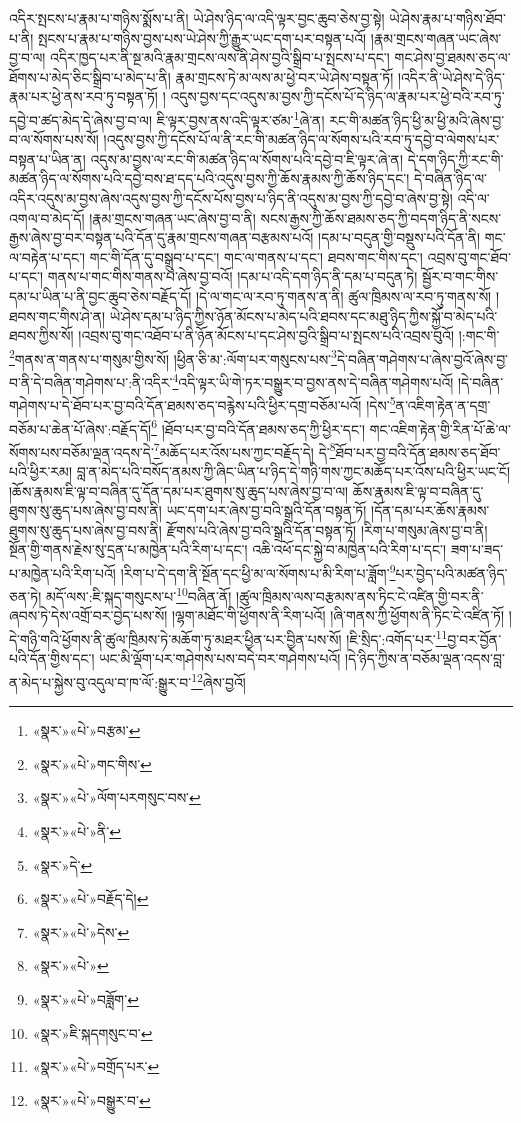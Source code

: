 འདིར་སྤངས་པ་རྣམ་པ་གཉིས་སྨོས་པ་ནི། ཡེ་ཤེས་ཉིད་ལ་འདི་ལྟར་བྱང་ཆུབ་ཅེས་བྱ་སྟེ། ཡེ་ཤེས་རྣམ་པ་གཉིས་ཐོབ་པ་ནི། སྤངས་པ་རྣམ་པ་གཉིས་བྱས་པས་ཡེ་ཤེས་ཀྱི་རྒྱུར་ཡང་དག་པར་བསྟན་པའོ། །རྣམ་གྲངས་གཞན་ཡང་ཞེས་བྱ་བ་ལ། འདིར་ཁྱད་པར་ནི་སྔ་མའི་རྣམ་གྲངས་ལས་ནི་ཤེས་བྱའི་སྒྲིབ་པ་སྤངས་པ་དང་། གང་ཤེས་བྱ་ཐམས་ཅད་ལ་ཐོགས་པ་མེད་ཅིང་སྒྲིབ་པ་མེད་པ་ནི། རྣམ་གྲངས་ཏེ་མ་ལས་མ་ཕྱེ་བར་ཡེ་ཤེས་བསྟན་ཏོ། །འདིར་ནི་ཡེ་ཤེས་དེ་ཉིད་རྣམ་པར་ཕྱེ་ནས་རབ་ཏུ་བསྟན་ཏོ། །
འདུས་བྱས་དང་འདུས་མ་བྱས་ཀྱི་དངོས་པོ་དེ་ཉིད་ལ་རྣམ་པར་ཕྱེ་བའི་རབ་ཏུ་དབྱེ་བ་ཚད་མེད་དེ་ཞེས་བྱ་བ་ལ། ཇི་ལྟར་བྱས་ནས་འདི་ལྟར་ཙམ་\footnote{«སྣར་»«པེ་»བརྩམ་}ཞེ་ན། རང་གི་མཚན་ཉིད་ཕྱི་མ་ཕྱི་མའི་ཞེས་བྱ་བ་ལ་སོགས་པས་སོ། །འདུས་བྱས་ཀྱི་དངོས་པོ་ལ་ནི་རང་གི་མཚན་ཉིད་ལ་སོགས་པའི་རབ་ཏུ་དབྱེ་བ་ལེགས་པར་བསྟན་པ་ཡིན་ན། འདུས་མ་བྱས་ལ་རང་གི་མཚན་ཉིད་ལ་སོགས་པའི་དབྱེ་བ་ཇི་ལྟར་ཞེ་ན། དེ་དག་ཉིད་ཀྱི་རང་གི་མཚན་ཉིད་ལ་སོགས་པའི་དབྱེ་བས་ཐ་དད་པའི་འདུས་བྱས་ཀྱི་ཆོས་རྣམས་ཀྱི་ཆོས་ཉིད་དང་། དེ་བཞིན་ཉིད་ལ་འདིར་འདུས་མ་བྱས་ཞེས་འདུས་བྱས་ཀྱི་དངོས་པོས་བྱས་པ་ཉིད་ནི་འདུས་མ་བྱས་ཀྱི་དབྱེ་བ་ཞེས་བྱ་སྟེ། འདི་ལ་འགལ་བ་མེད་དོ། །རྣམ་གྲངས་གཞན་ཡང་ཞེས་བྱ་བ་ནི། སངས་རྒྱས་ཀྱི་ཆོས་ཐམས་ཅད་ཀྱི་བདག་ཉིད་ནི་སངས་རྒྱས་ཞེས་བྱ་བར་བསྟན་པའི་དོན་དུ་རྣམ་གྲངས་གཞན་བརྩམས་པའོ། །དམ་པ་བདུན་གྱི་བསྡུས་པའི་དོན་ནི། གང་ལ་བརྟེན་པ་དང་། གང་གི་དོན་དུ་བསྒྲུབ་པ་དང་། གང་ལ་གནས་པ་དང་། ཐབས་གང་གིས་དང་། འབྲས་བུ་གང་ཐོབ་པ་དང་། གནས་པ་གང་གིས་གནས་པ་ཞེས་བྱ་བའོ། །དམ་པ་འདི་དག་ཉིད་ནི་དམ་པ་བདུན་ཏེ། སྦྱོར་བ་གང་གིས་དམ་པ་ཡིན་པ་ནི་བྱང་ཆུབ་ཅེས་བརྗོད་དོ། །དེ་ལ་གང་ལ་རབ་ཏུ་གནས་ན་ནི། ཚུལ་ཁྲིམས་ལ་རབ་ཏུ་གནས་སོ། །ཐབས་གང་གིས་ཤེ་ན། ཡེ་ཤེས་དམ་པ་ཉིད་ཀྱིས་ཉོན་མོངས་པ་མེད་པའི་ཐབས་དང་མཐུ་ཉིད་ཀྱིས་སྐྱོ་བ་མེད་པའི་ཐབས་ཀྱིས་སོ། །འབྲས་བུ་གང་འཐོབ་པ་ནི་ཉོན་མོངས་པ་དང་ཤེས་བྱའི་སྒྲིབ་པ་སྤངས་པའི་འབྲས་བུའོ། །:གང་གི་\footnote{«སྣར་»«པེ་»གང་གིས་}གནས་ན་གནས་པ་གསུམ་གྱིས་སོ། །ཕྱིན་ཅི་མ་:ལོག་པར་གསུངས་པས་\footnote{«སྣར་»«པེ་»ལོག་པརགསུང་བས་}དེ་བཞིན་གཤེགས་པ་ཞེས་བྱའོ་ཞེས་བྱ་བ་ནི་དེ་བཞིན་གཤེགས་པ་:ནི་འདིར་\footnote{«སྣར་»«པེ་»ནི་}འདི་ལྟར་ཡི་གེ་ཏར་བསྒྱུར་བ་བྱས་ནས་དེ་བཞིན་གཤེགས་པའོ། །དེ་བཞིན་གཤེགས་པ་དེ་ཐོབ་པར་བྱ་བའི་དོན་ཐམས་ཅད་བརྙེས་པའི་ཕྱིར་དགྲ་བཅོམ་པའོ། །དེས་\footnote{«སྣར་»དེ་}ན་འཇིག་རྟེན་ན་དགྲ་བཅོམ་པ་ཆེན་པོ་ཞེས་:བརྗོད་དོ།\footnote{«སྣར་»«པེ་»བརྗོད་དེ།} །ཐོབ་པར་བྱ་བའི་དོན་ཐམས་ཅད་ཀྱི་ཕྱིར་དང་། གང་འཇིག་རྟེན་གྱི་རིན་པོ་ཆེ་ལ་སོགས་པས་བཅོམ་ལྡན་འདས་དེ་\footnote{«སྣར་»«པེ་»དེས་}མཆོད་པར་འོས་པས་ཀྱང་བརྗོད་དེ། དེ་\footnote{«སྣར་»«པེ་»}ཐོབ་པར་བྱ་བའི་དོན་ཐམས་ཅད་ཐོབ་པའི་ཕྱིར་རམ། བླ་ན་མེད་པའི་བསོད་ནམས་ཀྱི་ཞིང་ཡིན་པ་ཉིད་དེ་གཉི་གས་ཀྱང་མཆོད་པར་འོས་པའི་ཕྱིར་ཡང་ངོ། །ཆོས་རྣམས་ཇི་ལྟ་བ་བཞིན་དུ་དོན་དམ་པར་ཐུགས་སུ་ཆུད་པས་ཞེས་བྱ་བ་ལ། ཆོས་རྣམས་ཇི་ལྟ་བ་བཞིན་དུ་ཐུགས་སུ་ཆུད་པས་ཞེས་བྱ་བས་ནི། ཡང་དག་པར་ཞེས་བྱ་བའི་སྒྲའི་དོན་བསྟན་ཏོ། །དོན་དམ་པར་ཆོས་རྣམས་ཐུགས་སུ་ཆུད་པས་ཞེས་བྱ་བས་ནི། རྫོགས་པའི་ཞེས་བྱ་བའི་སྒྲའི་དོན་བསྟན་ཏོ། །རིག་པ་གསུམ་ཞེས་བྱ་བ་ནི། སྔོན་གྱི་གནས་རྗེས་སུ་དྲན་པ་མཁྱེན་པའི་རིག་པ་དང་། འཆི་འཕོ་དང་སྐྱེ་བ་མཁྱེན་པའི་རིག་པ་དང་། ཟག་པ་ཟད་པ་མཁྱེན་པའི་རིག་པའོ། །རིག་པ་དེ་དག་ནི་སྔོན་དང་ཕྱི་མ་ལ་སོགས་པ་མི་རིག་པ་ཟློག་\footnote{«སྣར་»«པེ་»བཟློག་}པར་བྱེད་པའི་མཚན་ཉིད་ཅན་ཏེ། མདོ་ལས་:ཇི་སྐད་གསུངས་པ་\footnote{«སྣར་»ཇི་སྐདགསུང་བ་}བཞིན་ནོ། །ཚུལ་ཁྲིམས་ལས་བརྩམས་ནས་ཏིང་ངེ་འཛིན་གྱི་བར་ནི་ཞབས་ཏེ་དེས་འགྲོ་བར་བྱེད་པས་སོ། །ལྷག་མཐོང་གི་ཕྱོགས་ནི་རིག་པའོ། །ཞི་གནས་ཀྱི་ཕྱོགས་ནི་ཏིང་ངེ་འཛིན་ཏོ། །དེ་གཉི་གའི་ཕྱོགས་ནི་ཚུལ་ཁྲིམས་ཏེ་མཆོག་ཏུ་མཐར་ཕྱིན་པར་བྱིན་པས་སོ། །ཇི་སྲིད་:འགོད་པར་\footnote{«སྣར་»«པེ་»བགྲོད་པར་}བྱ་བར་བྱོན་པའི་དོན་གྱིས་དང་། ཡང་མི་ལྡོག་པར་གཤེགས་པས་བདེ་བར་གཤེགས་པའོ། །དེ་ཉིད་ཀྱིས་ན་བཅོམ་ལྡན་འདས་བླ་ན་མེད་པ་སྐྱེས་བུ་འདུལ་བ་ཁ་ལོ་:སྒྱུར་བ་\footnote{«སྣར་»«པེ་»བསྒྱུར་བ་}ཞེས་བྱའོ། 